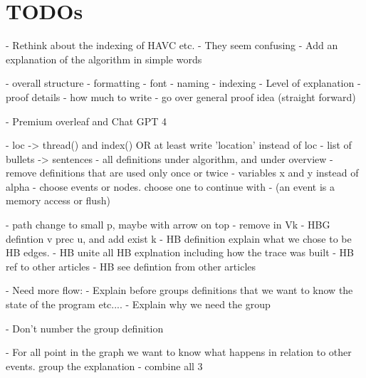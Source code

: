 \documentclass[a4paper,12pt]{article}
\begin{document}
\setlength\parskip{0.5em}
\setlength{\parindent}{0em}


\iffalse
\section{TODOs}


- Rethink about the indexing of HAVC etc.
    - They seem confusing
- Add an explanation of the algorithm in simple words


- overall structure
- formatting
    - font
    - naming
    - indexing
- Level of explanation
- proof details
    - how much to write
    - go over general proof idea (straight forward)

- Premium overleaf and Chat GPT 4








- loc -> thread() and index() OR at least write 'location' instead of loc
- list of bullets -> sentences
- all definitions under algorithm, and under overview
- remove definitions that are used only once or twice
- variables x and y instead of alpha
- choose events or nodes. choose one to continue with
- (an event is a memory access or flush)

- path change to small p, maybe with arrow on top
     - remove in Vk
- HBG defintion v prec u, and add exist k
- HB definition explain what we chose to be HB edges.
- HB unite all HB explnation including how the trace was built
- HB ref to other articles
- HB see defintion from other articles

- Need more flow:
    - Explain before groups definitions that we want to know the state of the program etc....
    - Explain why we need the group

- Don't number the group definition

- For all point in the graph we want to know what happens in relation to other events. group the explanation
    - combine all 3
\end{document}
